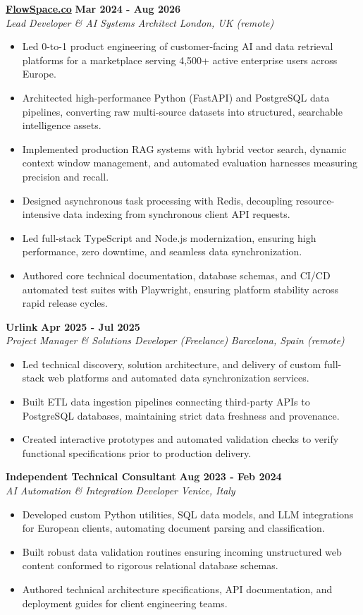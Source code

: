 \documentclass[10pt,a4paper]{article}
\newcommand{\role}[4]{%
  \textbf{#1} \hfill \textbf{#2}\\[1pt]%
  \textit{#3} \hfill \textit{#4}\\[2pt]%
}
\begin{document}
\role{\href{https://flowspace.co}{FlowSpace.co}}{Mar 2024 - Aug 2026}{Lead Developer \& AI Systems Architect}{London, UK (remote)}
\begin{itemize}
  \item Led 0-to-1 product engineering of customer-facing AI and data retrieval platforms for a marketplace serving 4,500+ active enterprise users across Europe.
  \item Architected high-performance Python (FastAPI) and PostgreSQL data pipelines, converting raw multi-source datasets into structured, searchable intelligence assets.
  \item Implemented production RAG systems with hybrid vector search, dynamic context window management, and automated evaluation harnesses measuring precision and recall.
  \item Designed asynchronous task processing with Redis, decoupling resource-intensive data indexing from synchronous client API requests.
  \item Led full-stack TypeScript and Node.js modernization, ensuring high performance, zero downtime, and seamless data synchronization.
  \item Authored core technical documentation, database schemas, and CI/CD automated test suites with Playwright, ensuring platform stability across rapid release cycles.
\end{itemize}

\role{Urlink}{Apr 2025 - Jul 2025}{Project Manager \& Solutions Developer (Freelance)}{Barcelona, Spain (remote)}
\begin{itemize}
  \item Led technical discovery, solution architecture, and delivery of custom full-stack web platforms and automated data synchronization services.
  \item Built ETL data ingestion pipelines connecting third-party APIs to PostgreSQL databases, maintaining strict data freshness and provenance.
  \item Created interactive prototypes and automated validation checks to verify functional specifications prior to production delivery.
\end{itemize}

\role{Independent Technical Consultant}{Aug 2023 - Feb 2024}{AI Automation \& Integration Developer}{Venice, Italy}
\begin{itemize}
  \item Developed custom Python utilities, SQL data models, and LLM integrations for European clients, automating document parsing and classification.
  \item Built robust data validation routines ensuring incoming unstructured web content conformed to rigorous relational database schemas.
  \item Authored technical architecture specifications, API documentation, and deployment guides for client engineering teams.
\end{itemize}
\end{document}

